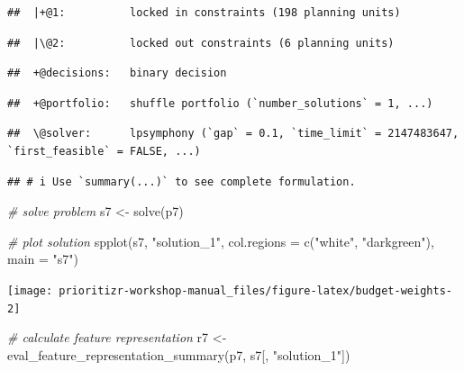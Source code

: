 \documentclass[
  12pt,
]{book}
\newenvironment{Shaded}{\begin{snugshade}}{\end{snugshade}}
\newcommand{\AttributeTok}[1]{\textcolor[rgb]{0.77,0.63,0.00}{#1}}
\newcommand{\CommentTok}[1]{\textcolor[rgb]{0.56,0.35,0.01}{\textit{#1}}}
\newcommand{\FunctionTok}[1]{\textcolor[rgb]{0.00,0.00,0.00}{#1}}
\newcommand{\NormalTok}[1]{#1}
\newcommand{\OtherTok}[1]{\textcolor[rgb]{0.56,0.35,0.01}{#1}}
\newcommand{\StringTok}[1]{\textcolor[rgb]{0.31,0.60,0.02}{#1}}
\begin{document}
\begin{verbatim}
##  |+@1:          locked in constraints (198 planning units)
\end{verbatim}

\begin{verbatim}
##  |\@2:          locked out constraints (6 planning units)
\end{verbatim}

\begin{verbatim}
##  +@decisions:   binary decision
\end{verbatim}

\begin{verbatim}
##  +@portfolio:   shuffle portfolio (`number_solutions` = 1, ...)
\end{verbatim}

\begin{verbatim}
##  \@solver:      lpsymphony (`gap` = 0.1, `time_limit` = 2147483647, `first_feasible` = FALSE, ...)
\end{verbatim}

\begin{verbatim}
## # i Use `summary(...)` to see complete formulation.
\end{verbatim}

\begin{Shaded}
\begin{Highlighting}[]
\CommentTok{\# solve problem}
\NormalTok{s7 }\OtherTok{\textless{}{-}} \FunctionTok{solve}\NormalTok{(p7)}

\CommentTok{\# plot solution}
\FunctionTok{spplot}\NormalTok{(s7, }\StringTok{"solution\_1"}\NormalTok{, }\AttributeTok{col.regions =} \FunctionTok{c}\NormalTok{(}\StringTok{"white"}\NormalTok{, }\StringTok{"darkgreen"}\NormalTok{), }\AttributeTok{main =} \StringTok{"s7"}\NormalTok{)}
\end{Highlighting}
\end{Shaded}

\begin{center}\texttt{[image: prioritizr-workshop-manual\_files/figure-latex/budget-weights-2]} \end{center}

\begin{Shaded}
\begin{Highlighting}[]
\CommentTok{\# calculate feature representation}
\NormalTok{r7 }\OtherTok{\textless{}{-}} \FunctionTok{eval\_feature\_representation\_summary}\NormalTok{(p7, s7[, }\StringTok{"solution\_1"}\NormalTok{])}
\end{Highlighting}
\end{Shaded}
\end{document}
